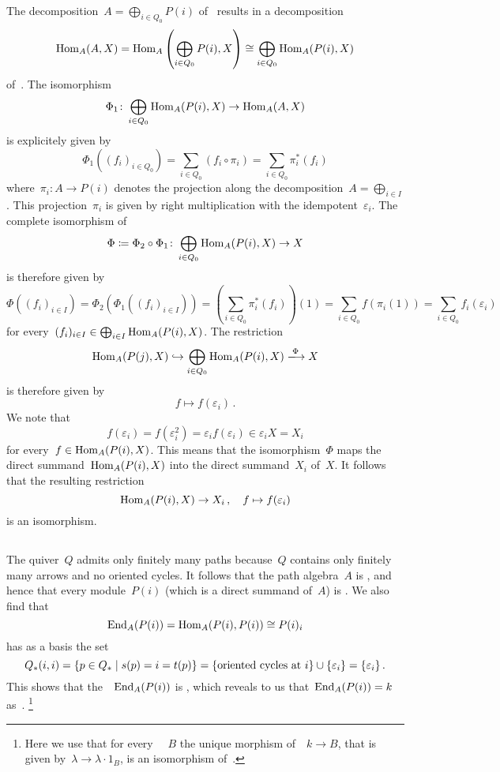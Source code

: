 The decomposition~$A = \bigoplus_{i \in Q_0} P(i)$ of~{} results in a decomposition
\[
  \operatorname{Hom}_A(A,X)
  =
  \operatorname{Hom}_A\left( \bigoplus_{i \in Q_0} P(i), X \right)
  \cong
  \bigoplus_{i \in Q_0} \operatorname{Hom}_A(P(i), X)
\]
of~{\kvss}.
The isomorphism
\[
  \Phi_1
  \colon
  \bigoplus_{i \in Q_0} \operatorname{Hom}_A(P(i), X)
  \to
  \operatorname{Hom}_A(A,X)
\]
is explicitely given by
\[
  \Phi_1((f_i)_{i \in Q_0})
  =
  \sum_{i \in Q_0} (f_i \circ \pi_i)
  =
  \sum_{i \in Q_0} \pi_i^*(f_i)
\]
where~$\pi_i \colon A \to P(i)$ denotes the projection along the decomposition~$A = \bigoplus_{i \in I}$.
This projection~$\pi_i$ is given by right multiplication with the idempotent~$\varepsilon_i$.
The complete isomorphism of~{\kvss}
\[
  \Phi
  \coloneqq
  \Phi_2 \circ \Phi_1
  \colon
  \bigoplus_{i \in Q_0} \operatorname{Hom}_A(P(i), X)
  \to
  X
\]
is therefore given by
\[
    \Phi((f_i)_{i \in I})
  = \Phi_2(\Phi_1( (f_i)_{i \in I} ) )
  = \left( \sum_{i \in Q_0} \pi_i^*(f_i) \right)(1)
  = \sum_{i \in Q_0} f(\pi_i(1))
  = \sum_{i \in Q_0} f_i(\varepsilon_i)
\]
for every~$(f_i)_{i \in I} \in \bigoplus_{i \in I} \operatorname{Hom}_A(P(i), X)$.
The restriction
\[
  \Hom_A(P(j), X)
  \inclusion
  \bigoplus_{i \in Q_0} \Hom_A(P(i), X)
  \xlongto{\Phi}
  X
\]
is therefore given by
\[
  f
  \mapsto
  f(\varepsilon_i) \,.
\]
We note that
\[
  f(\varepsilon_i)
  =
  f(\varepsilon_i^2)
  =
  \varepsilon_i f(\varepsilon_i)
  \in
  \varepsilon_i X
  =
  X_i
\]
for every~$f \in \operatorname{Hom}_A(P(i), X)$.
This means that the isomorphism~$\Phi$ maps the direct summand~$\operatorname{Hom}_A(P(i), X)$ into the direct summand~$X_i$ of~$X$.
It follows that the resulting restriction
\[
  \operatorname{Hom}_A(P(i), X)
  \to
  X_i \,,
  \quad
  f
  \mapsto
  f(\varepsilon_i)
\]
is an isomorphism.





\addtocounter{subsection}{1}
\subsection{}

The quiver~$Q$ admits only finitely many paths because~$Q$ contains only finitely many arrows and no oriented cycles.
It follows that the path algebra~$A$ is {\fd}, and hence that every module~$P(i)$ (which is a direct summand of~$A$) is {\fd}.
We also find that
\[
        \operatorname{End}_A(P(i))
  =     \operatorname{Hom}_A(P(i),P(i))
  \cong P(i)_i
\]
has as a basis the set
\[
    Q_*(i,i)
  = \{
      p \in Q_*
    \suchthat
      s(p) = i = t(p)
    \}
  = \{
      \text{oriented cycles at~$i$}
    \}
    \cup
    \{ \varepsilon_i \}
  = \{
      \varepsilon_i
    \} \,.
\]
This shows that the~{\kalg}~$\operatorname{End}_A(P(i))$ is , which reveals to us that~$\operatorname{End}_A(P(i)) = k$ as~{\kalgs}.%
\footnote{Here we use that for every ~{\kalg}~$B$ the unique morphism of~{\kalgs}~$k \to B$, that is given by~$\lambda \to \lambda \cdot 1_B$, is an isomorphism of~{\kalgs}.}





